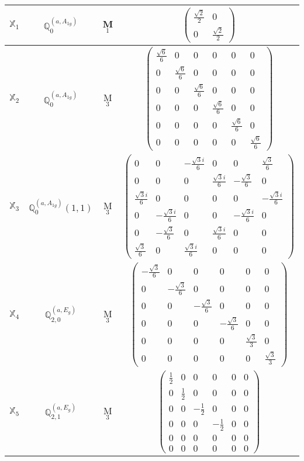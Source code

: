 \documentclass[fleqn,10pt,landscape]{article}
\begin{document}
\begin{itemize}
\begin{center}
\begin{longtable}{c|c|c|c}
$ \mathbb{X}_{1} $ & $\mathbb{Q}_{0}^{(a,A_{1g})}$ & M$_{1}$ & $\begin{pmatrix} \frac{\sqrt{2}}{2} & 0 \\ 0 & \frac{\sqrt{2}}{2} \end{pmatrix}$ \\ \hline
$ \mathbb{X}_{2} $ & $\mathbb{Q}_{0}^{(a,A_{1g})}$ & M$_{3}$ & $\begin{pmatrix} \frac{\sqrt{6}}{6} & 0 & 0 & 0 & 0 & 0 \\ 0 & \frac{\sqrt{6}}{6} & 0 & 0 & 0 & 0 \\ 0 & 0 & \frac{\sqrt{6}}{6} & 0 & 0 & 0 \\ 0 & 0 & 0 & \frac{\sqrt{6}}{6} & 0 & 0 \\ 0 & 0 & 0 & 0 & \frac{\sqrt{6}}{6} & 0 \\ 0 & 0 & 0 & 0 & 0 & \frac{\sqrt{6}}{6} \end{pmatrix}$ \\
$ \mathbb{X}_{3} $ & $\mathbb{Q}_{0}^{(a,A_{1g})}(1,1)$ & M$_{3}$ & $\begin{pmatrix} 0 & 0 & - \frac{\sqrt{3} i}{6} & 0 & 0 & \frac{\sqrt{3}}{6} \\ 0 & 0 & 0 & \frac{\sqrt{3} i}{6} & - \frac{\sqrt{3}}{6} & 0 \\ \frac{\sqrt{3} i}{6} & 0 & 0 & 0 & 0 & - \frac{\sqrt{3} i}{6} \\ 0 & - \frac{\sqrt{3} i}{6} & 0 & 0 & - \frac{\sqrt{3} i}{6} & 0 \\ 0 & - \frac{\sqrt{3}}{6} & 0 & \frac{\sqrt{3} i}{6} & 0 & 0 \\ \frac{\sqrt{3}}{6} & 0 & \frac{\sqrt{3} i}{6} & 0 & 0 & 0 \end{pmatrix}$ \\
$ \mathbb{X}_{4} $ & $\mathbb{Q}_{2,0}^{(a,E_{g})}$ & M$_{3}$ & $\begin{pmatrix} - \frac{\sqrt{3}}{6} & 0 & 0 & 0 & 0 & 0 \\ 0 & - \frac{\sqrt{3}}{6} & 0 & 0 & 0 & 0 \\ 0 & 0 & - \frac{\sqrt{3}}{6} & 0 & 0 & 0 \\ 0 & 0 & 0 & - \frac{\sqrt{3}}{6} & 0 & 0 \\ 0 & 0 & 0 & 0 & \frac{\sqrt{3}}{3} & 0 \\ 0 & 0 & 0 & 0 & 0 & \frac{\sqrt{3}}{3} \end{pmatrix}$ \\
$ \mathbb{X}_{5} $ & $\mathbb{Q}_{2,1}^{(a,E_{g})}$ & M$_{3}$ & $\begin{pmatrix} \frac{1}{2} & 0 & 0 & 0 & 0 & 0 \\ 0 & \frac{1}{2} & 0 & 0 & 0 & 0 \\ 0 & 0 & - \frac{1}{2} & 0 & 0 & 0 \\ 0 & 0 & 0 & - \frac{1}{2} & 0 & 0 \\ 0 & 0 & 0 & 0 & 0 & 0 \\ 0 & 0 & 0 & 0 & 0 & 0 \end{pmatrix}$ \\

\end{longtable}
\end{center}
\end{itemize}
\end{document}
